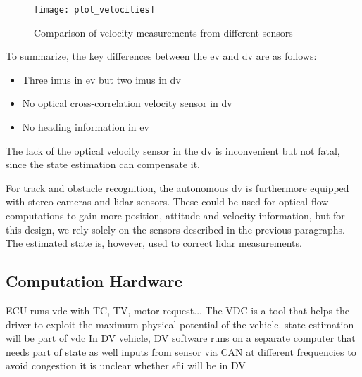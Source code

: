 \begin{figure}
	\centering
	\texttt{[image: plot\_velocities]}%
	\caption{Comparison of velocity measurements from different sensors}
	\label{fig:velocities}
\end{figure}

To summarize, the key differences between the \gls{ev} and \gls{dv} are as follows:
\begin{itemize}
\item Three \glspl{imu} in \gls{ev} but two \glspl{imu} in \gls{dv}
\item No optical cross-correlation velocity sensor in \gls{dv}
\item No heading information in \gls{ev}
\end{itemize}
The lack of the optical velocity sensor in the \gls{dv} is inconvenient but not fatal, since the state estimation can compensate it.

For track and obstacle recognition, the autonomous \gls{dv} is furthermore equipped with stereo cameras and lidar sensors. These could be used for optical flow computations to gain more position, attitude and velocity information, but for this design, we rely solely on the sensors described in the previous paragraphs. The estimated state is, however, used to correct lidar measurements.


\subsection{Computation Hardware}
ECU runs \gls{vdc} with TC, TV, motor request...
The VDC is a tool that helps the driver to exploit the maximum physical potential of the vehicle.
state estimation will be part of \gls{vdc}
In DV vehicle, DV software runs on a separate computer that needs part of state as well
inputs from sensor via CAN at different frequencies to avoid congestion
it is unclear whether sfii will be in DV
